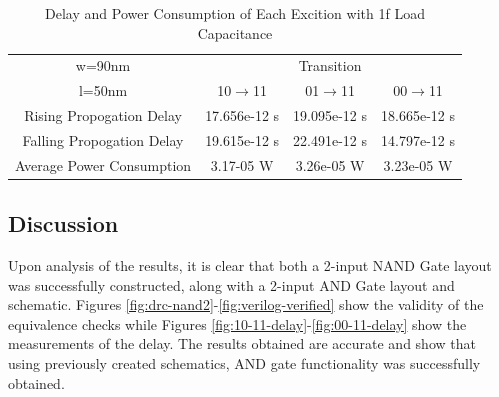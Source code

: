 \documentclass[12pt]{article}
\begin{document}
\begin{table}[H]
	\begin{center}
		\begin{tabular}{ |c|c|c|c| }
			\hline
			w=90nm &
			\multicolumn{3}{|c|}{Transition} \\
			\cline{2-4} l=50nm & 10$\to$11 & 01$\to$11 & 00$\to$11 \\
			\hline
			Rising Propogation Delay & 17.656e-12 s & 19.095e-12 s & 18.665e-12 s  \\
			\hline
			Falling Propogation Delay & 19.615e-12 s& 22.491e-12 s& 14.797e-12 s\\
			\hline
			Average Power Consumption & 3.17-05 W& 3.26e-05 W& 3.23e-05 W\\
			\hline
		\end{tabular}
	\end{center}
	\caption{Delay and Power Consumption of Each Excition with 1f Load Capacitance}
	\label{tab:1st}
\end{table}

\subsection{Discussion}
Upon analysis of the results, it is clear that both a 2-input NAND Gate layout was successfully constructed, along with a 2-input AND Gate layout and schematic. Figures \ref{fig:drc-nand2}-\ref{fig:verilog-verified} show the validity of the equivalence checks while Figures \ref{fig:10-11-delay}-\ref{fig:00-11-delay} show the measurements of the delay. The results obtained are accurate and show that using previously created schematics, AND gate functionality was successfully obtained.
\end{document}
